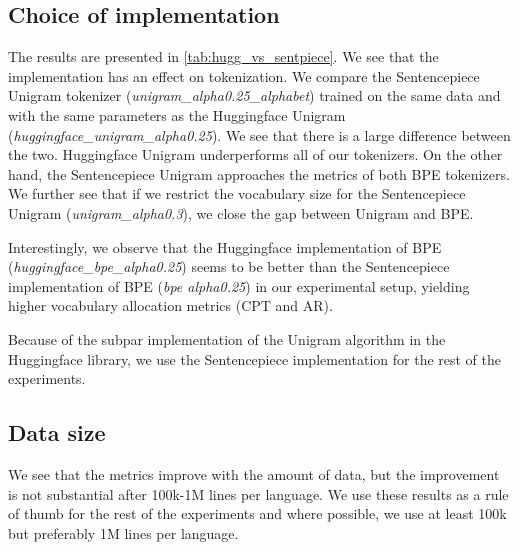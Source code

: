 \subsection{Choice of implementation}
\label{sec:implementation}



The results are presented in \autoref{tab:hugg_vs_sentpiece}. We see that the implementation has an effect on tokenization. We compare the Sentencepiece Unigram tokenizer (\textit{unigram\_alpha0.25\_alphabet}) trained on the same data and with the same parameters as the Huggingface Unigram (\textit{huggingface\_unigram\_alpha0.25}). We see that there is a large difference between the two. Huggingface Unigram underperforms all of our tokenizers. On the other hand, the Sentencepiece Unigram approaches the metrics of both BPE tokenizers. We further see that if we restrict the vocabulary size for the Sentencepiece Unigram (\textit{unigram\_alpha0.3}), we close the gap between Unigram and BPE. 

Interestingly, we observe that the Huggingface implementation of BPE (\textit{huggingface\_bpe\_alpha0.25}) seems to be better than the Sentencepiece implementation of BPE (\textit{bpe alpha0.25}) in our experimental setup, yielding higher vocabulary allocation metrics (CPT and AR).

Because of the subpar implementation of the Unigram algorithm in the Huggingface library, we use the Sentencepiece implementation for the rest of the experiments.

\subsection{Data size}
\label{sec:data_size}



We see that the metrics improve with the amount of data, but the improvement is not substantial after 100k-1M lines per language. We use these results as a rule of thumb for the rest of the experiments and where possible, we use at least 100k but preferably 1M lines per language.

